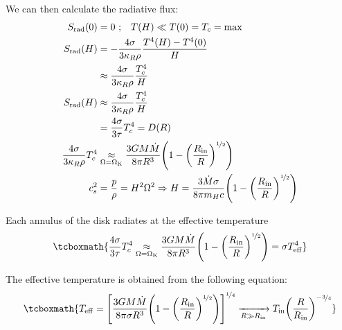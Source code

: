 \documentclass[10pt,a4paper,english]{article}
\let\originalleft\left
\let\originalright\right
\renewcommand{\left}{\mathopen{}\mathclose\bgroup\originalleft}
\renewcommand{\right}{\aftergroup\egroup\originalright}
\begin{document}
We can then calculate the radiative flux:
\begin{align}
    S_\mathrm{rad}(0)   & = 0 \ \mathrm{;}\quad T(H) \ll T(0) = T_c = \mathrm{max}  \\
    S_\mathrm{rad}(H) & = -\frac{4\sigma}{3\kappa_R \rho}\frac{T^4(H)-T^4(0)}{H} \\
                        & \approx \frac{4\sigma}{3\kappa_R \rho}\frac{T^4_c}{H} \\
    S_\mathrm{rad}(H) & \approx  \frac{4\sigma}{3\kappa_R \rho}\frac{T^4_c}{H}  \\
                        & = \frac{4\sigma}{3\tau}T_c^4 = D(R) \\
    \frac{4\sigma}{3\kappa_R \rho}T^4_c & \underset{\mathrm{\Omega = \Omega_K}}{\approx}
    \frac{3GM\dot{M}}{8\pi R^3}\left( 1-\left(\frac{R_\mathrm{in}}{R}\right)^{\nicefrac{1}{2}}\right) \\
    c_s^2 & = \frac{p}{\rho} = H^2\Omega^2 \Rightarrow H = \frac{3\dot{M}\sigma}{8\pi m_H c }
    \left(  1-\left(\frac{R_\mathrm{in}}{R}\right)^{\nicefrac{1}{2}} \right)
\end{align}

Each annulus of the disk radiates at the effective temperature
\begin{equation}
    \tcboxmath{
        \frac{4\sigma}{3\tau}T^4_c\underset{\mathrm{\Omega = \Omega_K}}{\approx}
        \frac{3GM\dot{M}}{8\pi R^3}\left(  1-\left(\frac{R_\mathrm{in}}{R}\right)^{\nicefrac{1}{2}}\right) =
        \sigma T_\mathrm{eff}^4
    }
\end{equation}

The effective temperature is obtained from the following equation:
\begin{equation}
    \tcboxmath{
        T_\mathrm{eff} = \left[ \frac{3GM\dot{M}}{8\pi \sigma R^3}
        \left(  1-\left(\frac{R_\mathrm{in}}{R}\right)^{\nicefrac{1}{2}}\right)\right]^{\nicefrac{1}{4}}
        \xrightarrow[R \gg R_\mathrm{in}]{}  T_\mathrm{in}\left(\frac{R}{R_\mathrm{in}}\right)^{-\nicefrac{3}{4}}
    }
\end{equation}
\end{document}
